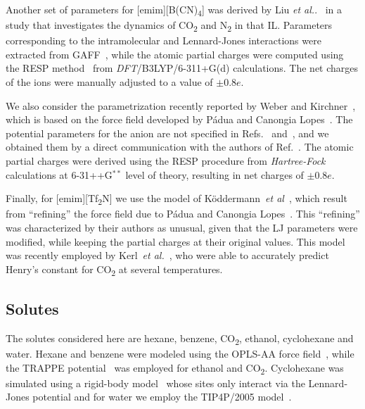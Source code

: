 \documentclass[3p,twocolumn]{elsarticle}
\begin{document}
Another set of parameters for [emim][B(CN)\textsubscript{4}] was derived by Liu \textit{et al.}.~\cite{Liu_2014} in a study that investigates the dynamics of CO\textsubscript{2} and N\textsubscript{2} in that IL. Parameters corresponding to the intramolecular and Lennard-Jones interactions were extracted from GAFF~\cite{Wang_2004}, while the atomic partial charges were computed using the RESP method~\cite{Bayly_1993} from \textit{DFT}/B3LYP/6-311+G(d) calculations. The net charges of the ions were manually adjusted to a value of $\pm$0.8$e$.

We also consider the parametrization recently reported by Weber and Kirchner~\cite{Weber_2016}, which is based on the force field developed by P{\'{a}}dua and Canongia Lopes~\cite{Canongia_Lopes_2006}. The potential parameters for the anion are not specified in Refs.~ and~, and we obtained them by a direct communication with the authors of Ref.~. The atomic partial charges were derived using the RESP procedure from \textit{Hartree-Fock} calculations at 6-31++G$^{\ast \ast}$ level of theory, resulting in net charges of $\pm$0.8$e$.

Finally, for [emim][Tf\textsubscript{2}N] we use the model of K\"{o}ddermann~\textit{et al}~\cite{K_ddermann_2007}, which result from ``refining'' the force field due to P{\'{a}}dua and Canongia Lopes~\cite{Canongia_Lopes_2006}. This ``refining'' was characterized by their authors as unusual, given that the LJ parameters were modified, while keeping the partial charges at their original values. This model was recently employed by Kerl~\textit{et al.}~\cite{Kerl__2017}, who were able to accurately predict Henry's constant for CO\textsubscript{2} at several temperatures.

\subsection{Solutes}
\label{sec:force_field_sol}

The solutes considered here are hexane, benzene, CO\textsubscript{2}, ethanol, cyclohexane and water. Hexane and benzene were modeled using the OPLS-AA force field~\cite{Jorgensen_1996}, while the TRAPPE potential~\cite{Chen_2001,Potoff_2001} was employed for ethanol and CO\textsubscript{2}. Cyclohexane was simulated using a rigid-body model~\cite{munoz2015lennard} whose sites only interact via the Lennard-Jones potential and for water we employ the TIP4P/2005 model~\cite{Abascal_2005,Vega_2011}. 
\end{document}
